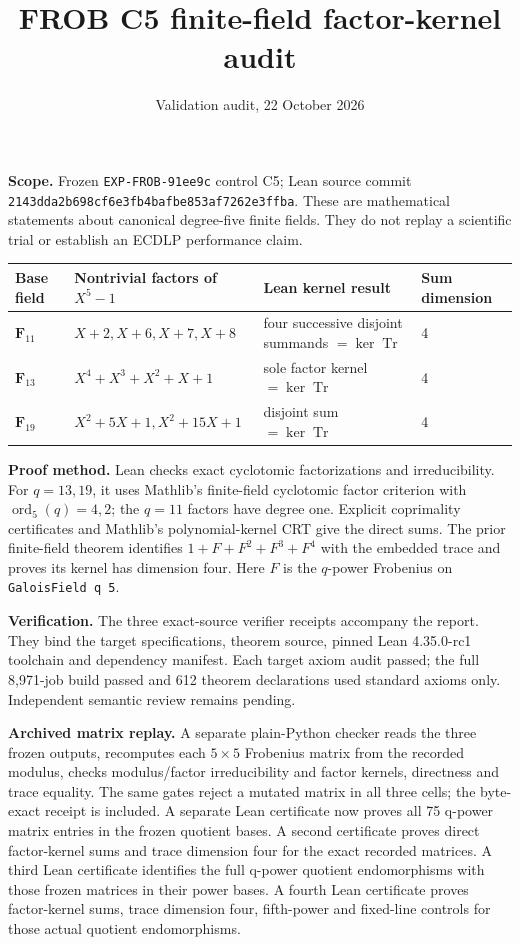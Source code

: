 \documentclass[10pt]{article}
\title{FROB C5 finite-field factor-kernel audit}
\author{Validation audit, 22 October 2026}
\date{}
\begin{document}
\maketitle
\vspace{-2em}

\textbf{Scope.} Frozen \texttt{EXP-FROB-91ee9c} control C5;
Lean source commit \texttt{2143dda2b698cf6e3fb4bafbe853af7262e3ffba}.
These are mathematical statements about canonical degree-five finite fields.
They do not replay a scientific trial or establish an ECDLP performance claim.

\begin{center}
\begin{tabular}{llll}
\toprule
Base field & Nontrivial factors of $X^5-1$ & Lean kernel result & Sum dimension \\
\midrule
$\mathbf F_{11}$ & $X+2, X+6, X+7, X+8$ & four successive disjoint summands $=\ker\operatorname{Tr}$ & 4 \\
$\mathbf F_{13}$ & $X^4+X^3+X^2+X+1$ & sole factor kernel $=\ker\operatorname{Tr}$ & 4 \\
$\mathbf F_{19}$ & $X^2+5X+1, X^2+15X+1$ & disjoint sum $=\ker\operatorname{Tr}$ & 4 \\
\bottomrule
\end{tabular}
\end{center}

\textbf{Proof method.} Lean checks exact cyclotomic factorizations and
irreducibility. For $q=13,19$, it uses Mathlib's finite-field cyclotomic
factor criterion with $\operatorname{ord}_5(q)=4,2$; the $q=11$ factors have
degree one. Explicit coprimality certificates and Mathlib's polynomial-kernel
CRT give the direct sums. The prior finite-field theorem identifies
$1+F+F^2+F^3+F^4$ with the embedded trace and proves its kernel has dimension
four. Here $F$ is the $q$-power Frobenius on \texttt{GaloisField q 5}.

\textbf{Verification.} The three exact-source verifier receipts accompany the
report. They bind the target specifications, theorem source, pinned Lean
4.35.0-rc1 toolchain and dependency manifest. Each target axiom audit
passed; the full 8,971-job build passed and 612 theorem declarations used
standard axioms only. Independent semantic review remains pending.

\textbf{Archived matrix replay.} A separate plain-Python checker reads the
three frozen outputs, recomputes each $5\times5$ Frobenius matrix from the
recorded modulus, checks modulus/factor irreducibility and factor kernels,
directness and trace equality. The same gates reject a mutated matrix in all
three cells; the byte-exact receipt is included. A separate Lean certificate
now proves all 75 q-power matrix entries in the frozen quotient bases. A second
certificate proves direct factor-kernel sums and trace dimension four for the
exact recorded matrices. A third Lean certificate identifies the full
q-power quotient endomorphisms with those frozen matrices in their power bases.
A fourth Lean certificate proves factor-kernel sums, trace dimension four,
fifth-power and fixed-line controls for those actual quotient endomorphisms.
\end{document}
